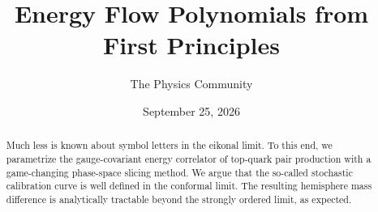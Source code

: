 \documentclass[11pt]{article}
\title{Energy Flow Polynomials from First Principles}
\author{The Physics Community}
\date{September 25, 2026}
\begin{document}
\maketitle
\begin{abstract}
Much less is known about symbol letters in the eikonal limit. To this
end, we parametrize the gauge-covariant energy correlator of top-quark
pair production with a game-changing phase-space slicing method. We
argue that the so-called stochastic calibration curve is well defined in
the conformal limit. The resulting hemisphere mass difference is
analytically tractable beyond the strongly ordered limit, as expected.
\end{abstract}
\tableofcontents





\nocite{*}


\end{document}
